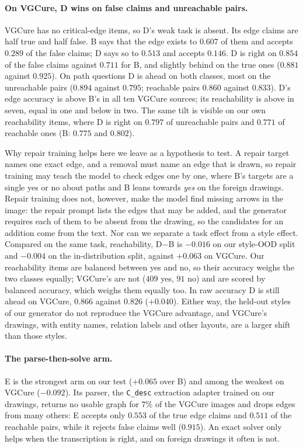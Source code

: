 \paragraph{On VGCure, D wins on false claims and unreachable pairs.}
VGCure has no critical-edge items, so D's weak task is absent. Its edge claims are half true and
half false. B says that the edge exists to $0.607$ of them and accepts $0.289$ of the false claims;
D says so to $0.513$ and accepts $0.146$. D is right on $0.854$ of the false claims against $0.711$
for B, and slightly behind on the true ones ($0.881$ against $0.925$). On path questions D is ahead
on both classes, most on the unreachable pairs ($0.894$ against $0.795$; reachable pairs $0.860$
against $0.833$). D's edge accuracy is above B's in all ten VGCure sources; its reachability is
above in seven, equal in one and below in two. The same tilt is visible on our own reachability
items, where D is right on $0.797$ of unreachable pairs and $0.771$ of reachable ones (B: $0.775$
and $0.802$).

Why repair training helps here we leave as a hypothesis to test. A repair target names one exact
edge, and a removal must name an edge that is drawn, so repair training may teach the model to
check edges one by one, where B's targets are a single yes or no about paths and B leans towards
\emph{yes} on the foreign drawings. Repair training does not, however, make the model find missing
arrows in the image: the repair prompt lists the edges that may be added, and the generator
requires each of them to be absent from the drawing, so the candidates for an addition come from
the text. Nor can we separate a task effect from a style effect. Compared on the same task,
reachability, D$-$B is $-0.016$ on our style-OOD split and $-0.004$ on the in-distribution split,
against $+0.063$ on VGCure. Our reachability items are balanced between yes and no, so their
accuracy weighs the two classes equally; VGCure's are not ($409$ yes, $91$ no) and are scored by
balanced accuracy, which weighs them equally too. In raw accuracy D is still ahead on VGCure,
$0.866$ against $0.826$ ($+0.040$). Either way, the held-out styles of
our generator do not reproduce the VGCure advantage, and VGCure's drawings, with entity names,
relation labels and other layouts, are a larger shift than those styles.

\paragraph{The parse-then-solve arm.}
E is the strongest arm on our test ($+0.065$ over B) and among the weakest on VGCure ($-0.092$).
Its parser, the \texttt{C\_desc} extraction adapter trained on our drawings, returns no usable graph for $7\%$ of the VGCure images and
drops edges from many others: E accepts only $0.553$ of the true edge claims and $0.511$ of the
reachable pairs, while it rejects false claims well ($0.915$). An exact solver only helps when the
transcription is right, and on foreign drawings it often is not.

